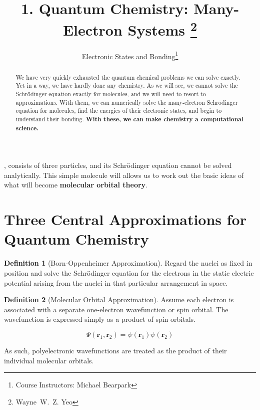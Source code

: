 \documentclass[a4paper]{tufte-handout}
\title{1. Quantum Chemistry: Many-Electron Systems \thanks{Wayne~W.~Z. Yeo}}
\author[ESB]{Electronic States and Bonding\thanks{Course Instructors: Michael Bearpark}}
\theoremstyle{definition}
\newtheorem{definition}{Definition}
\begin{document}
\maketitle%

\begin{abstract}
\noindent
We have very quickly exhausted the quantum chemical problems we can solve exactly.
Yet in a way, we have hardly done any chemistry. As we will see, we cannot solve the 
Schrödinger equation exactly for molecules, and we will need to resort to approximations.
With them, we can numerically solve the many-electron Schrödinger
equation for molecules, find the energies of their electronic states, and begin to
understand their bonding. \textbf{With these, we can make chemistry a computational science.}
\end{abstract}


,  consists of three particles, and its
Schrödinger equation cannot be solved analytically. This simple molecule
will allows us to work out the basic ideas of what will become \textbf{molecular orbital theory}.

\section{Three Central Approximations for Quantum Chemistry}

\begin{definition}[Born-Oppenheimer Approximation] Regard the nuclei as
  fixed in position and solve the Schrödinger equation for the electrons in 
  the static electric potential arising from the nuclei in that particular
  arrangement in space.
\end{definition} 

\begin{definition}[Molecular Orbital Approximation] 

  Assume each electron is associated with a separate one-electron wavefunction 
  or spin orbital. The wavefunction is expressed simply as a product of spin orbitals.

  \begin{equation}
    \Psi (\mathbf{r}_1, \mathbf{r}_2) = \psi(\mathbf{r}_1) \psi(\mathbf{r}_2)
  \end{equation} 

  As such, polyelectronic wavefunctions are treated as the product
  of their individual molecular orbitals.

\end{definition}
\end{document}
